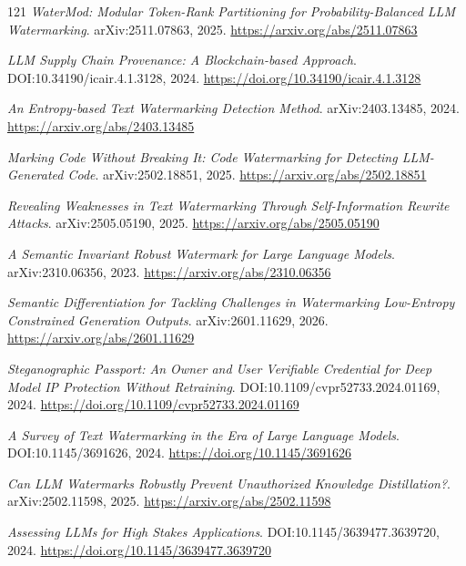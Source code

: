 \documentclass[11pt,a4paper]{article}
\begin{document}
\begin{thebibliography}{121}
\newblock \emph{WaterMod: Modular Token-Rank Partitioning for Probability-Balanced LLM Watermarking}.
\newblock arXiv:2511.07863, 2025.
\newblock \url{https://arxiv.org/abs/2511.07863}

\newblock \emph{LLM Supply Chain Provenance: A Blockchain-based Approach}.
\newblock DOI:10.34190/icair.4.1.3128, 2024.
\newblock \url{https://doi.org/10.34190/icair.4.1.3128}

\newblock \emph{An Entropy-based Text Watermarking Detection Method}.
\newblock arXiv:2403.13485, 2024.
\newblock \url{https://arxiv.org/abs/2403.13485}

\newblock \emph{Marking Code Without Breaking It: Code Watermarking for Detecting LLM-Generated Code}.
\newblock arXiv:2502.18851, 2025.
\newblock \url{https://arxiv.org/abs/2502.18851}

\newblock \emph{Revealing Weaknesses in Text Watermarking Through Self-Information Rewrite Attacks}.
\newblock arXiv:2505.05190, 2025.
\newblock \url{https://arxiv.org/abs/2505.05190}

\newblock \emph{A Semantic Invariant Robust Watermark for Large Language Models}.
\newblock arXiv:2310.06356, 2023.
\newblock \url{https://arxiv.org/abs/2310.06356}

\newblock \emph{Semantic Differentiation for Tackling Challenges in Watermarking Low-Entropy Constrained Generation Outputs}.
\newblock arXiv:2601.11629, 2026.
\newblock \url{https://arxiv.org/abs/2601.11629}

\newblock \emph{Steganographic Passport: An Owner and User Verifiable Credential for Deep Model IP Protection Without Retraining}.
\newblock DOI:10.1109/cvpr52733.2024.01169, 2024.
\newblock \url{https://doi.org/10.1109/cvpr52733.2024.01169}

\newblock \emph{A Survey of Text Watermarking in the Era of Large Language Models}.
\newblock DOI:10.1145/3691626, 2024.
\newblock \url{https://doi.org/10.1145/3691626}

\newblock \emph{Can LLM Watermarks Robustly Prevent Unauthorized Knowledge Distillation?}.
\newblock arXiv:2502.11598, 2025.
\newblock \url{https://arxiv.org/abs/2502.11598}

\newblock \emph{Assessing LLMs for High Stakes Applications}.
\newblock DOI:10.1145/3639477.3639720, 2024.
\newblock \url{https://doi.org/10.1145/3639477.3639720}


\end{thebibliography}
\end{document}
